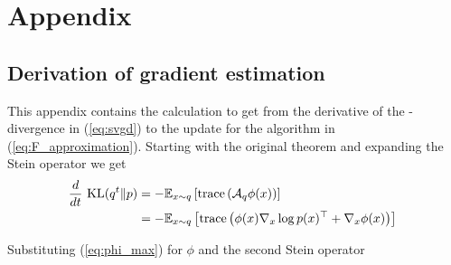 \documentclass{article}
\begin{document}


\section{Appendix}
\subsection{Derivation of gradient estimation}
    This appendix contains the calculation to get from the derivative of the \KL-divergence in (\ref{eq:svgd})
    to the update for the algorithm in (\ref{eq:F_approximation}).
    Starting with the original theorem and expanding the Stein operator we get
    \begin{align}
        \frac{d}{dt}\ \textrm{KL}( q^t \| p ) &= - \mathbb{E}_{x \sim q} \left[ \text{trace} \left( \mathcal{A}_q \phi(x) \right) \right] \\
             &=  - \mathbb{E}_{x \sim q} \left[ 
                 \text{trace} \left( \phi(x) \nabla_x \log p(x)^\top  + \nabla_x \phi(x) \right)
             \right]\
    \end{align}

    Substituting (\ref{eq:phi_max}) for $\phi$ and the second Stein operator
\end{document}
